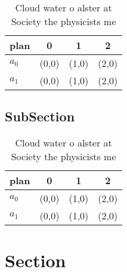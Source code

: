 \documentclass[a4paper]{article}
\begin{document}
\begin{table}
\begin{adjustbox}{width=0.6\columnwidth}
\begin{tabular}{|l|l|l|l|}
\hline
\textbf{plan} & \multicolumn{1}{c|}{\textbf{0}} & \multicolumn{1}{c|}{\textbf{1}} & \multicolumn{1}{c|}{\textbf{2}} \\ \hline
\textbf{$a_0$}  & (0,0) & (1,0) & (2,0) \\ \hline
\textbf{$a_1$}  & (0,0) & (1,0) & (2,0) \\ \hline
\end{tabular}
\end{adjustbox}
\caption{Cloud water o alster at Society the physicists me
}
\end{table}

\subsection{SubSection}

\begin{table}
\begin{adjustbox}{width=0.6\columnwidth}
\begin{tabular}{|l|l|l|l|}
\hline
\textbf{plan} & \multicolumn{1}{c|}{\textbf{0}} & \multicolumn{1}{c|}{\textbf{1}} & \multicolumn{1}{c|}{\textbf{2}} \\ \hline
\textbf{$a_0$}  & (0,0) & (1,0) & (2,0) \\ \hline
\textbf{$a_1$}  & (0,0) & (1,0) & (2,0) \\ \hline
\end{tabular}
\end{adjustbox}
\caption{Cloud water o alster at Society the physicists me
}
\end{table}

\section{Section}
\end{document}
